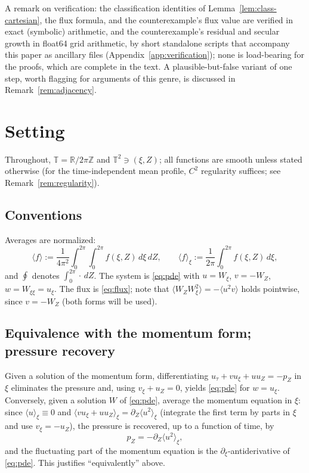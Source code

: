 \documentclass[11pt]{amsart}
\theoremstyle{definition}
\theoremstyle{remark}
\newcommand{\T}{\mathbb{T}}
\newcommand{\R}{\mathbb{R}}
\newcommand{\mean}[1]{\langle #1\rangle}
\begin{document}
A remark on verification: the classification identities of
Lemma~\ref{lem:class-cartesian}, the flux formula, and the
counterexample's flux value are verified in exact (symbolic) arithmetic,
and the counterexample's residual and secular growth in float64 grid
arithmetic, by short standalone scripts that accompany this paper as
ancillary files (Appendix~\ref{app:verification}); none is load-bearing
for the proofs, which are complete in the text. A plausible-but-false
variant of one step, worth flagging for arguments of this genre, is
discussed in Remark~\ref{rem:adjacency}.

\section{Setting}\label{sec:setting}

Throughout, $\T=\R/2\pi\mathbb{Z}$ and $\T^2\ni(\xi,Z)$; all functions
are smooth unless stated otherwise (for the time-independent mean
profile, $C^2$ regularity suffices; see Remark~\ref{rem:regularity}).

\subsection{Conventions}\label{subsec:conventions}
Averages are normalized:
\[
  \mean{f}:=\frac1{4\pi^2}\int_0^{2\pi}\!\!\int_0^{2\pi}
  f(\xi,Z)\,d\xi\,dZ,
  \qquad
  \mean{f}_\xi:=\frac1{2\pi}\int_0^{2\pi}f(\xi,Z)\,d\xi ,
\]
and $\oint$ denotes $\int_0^{2\pi}\cdot\,dZ$. The system is
\eqref{eq:pde} with $u=W_\xi$, $v=-W_Z$, $w=W_{\xi\xi}=u_\xi$. The flux
is \eqref{eq:flux}; note that $\mean{W_ZW_\xi^2}=-\mean{u^2v}$ holds
pointwise, since $v=-W_Z$ (both forms will be used).

\subsection{Equivalence with the momentum form; pressure recovery}
\label{subsec:equiv}
Given a solution of the momentum form, differentiating
$u_\tau+vu_\xi+uu_Z=-p_Z$ in $\xi$ eliminates the pressure and, using
$v_\xi+u_Z=0$, yields \eqref{eq:pde} for $w=u_\xi$. Conversely, given a
solution $W$ of \eqref{eq:pde}, average the momentum equation in $\xi$:
since $\mean{u}_\xi\equiv0$ and
$\mean{vu_\xi+uu_Z}_\xi=\partial_Z\mean{u^2}_\xi$ (integrate the first
term by parts in $\xi$ and use $v_\xi=-u_Z$), the pressure is recovered,
up to a function of time, by
\[
  p_Z=-\partial_Z\mean{u^2}_\xi ,
\]
and the fluctuating part of the momentum equation is the
$\partial_\xi$-antiderivative of \eqref{eq:pde}. This justifies
``equivalently'' above.
\end{document}
